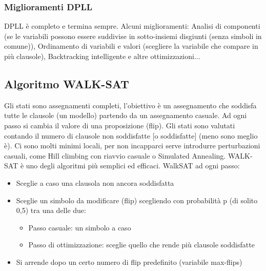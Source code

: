 \documentclass{article}
\begin{document}
\subsubsection{Miglioramenti DPLL}
DPLL è completo e termina sempre. Alcuni miglioramenti: Analisi di componenti (se le variabili possono essere suddivise in sotto-insiemi disgiunti (senza simboli in comune)), Ordinamento di variabili e valori (scegliere la variabile che compare in più clausole), Backtracking intelligente e altre ottimizzazioni...
\subsection{Algoritmo WALK-SAT}
Gli stati sono assegnamenti completi, l’obiettivo è un assegnamento che soddisfa tutte le clausole (un modello) partendo da un assegnamento casuale. Ad ogni passo si cambia il valore di una proposizione (flip). Gli stati sono valutati contando il numero di clausole non soddisfatte [o soddisfatte] (meno sono meglio è). Ci sono molti minimi locali, per non incapparci serve introdurre perturbazioni casuali, come Hill climbing con riavvio casuale o Simulated Annealing. WALK-SAT è uno degli algoritmi più semplici ed efficaci. \newline 
WalkSAT ad ogni passo: 
\begin{itemize}
    \item Sceglie a caso una clausola non ancora soddisfatta
    \item Sceglie un simbolo da modificare (flip) scegliendo con probabilità p (di solito 0,5) tra una delle due: \begin{itemize}
        \item Passo casuale: un simbolo a caso
        \item Passo di ottimizzazione: sceglie quello che rende più clausole soddisfatte
    \end{itemize}
    \item Si arrende dopo un certo numero di flip predefinito (variabile max-flips)
\end{itemize}
\end{document}
